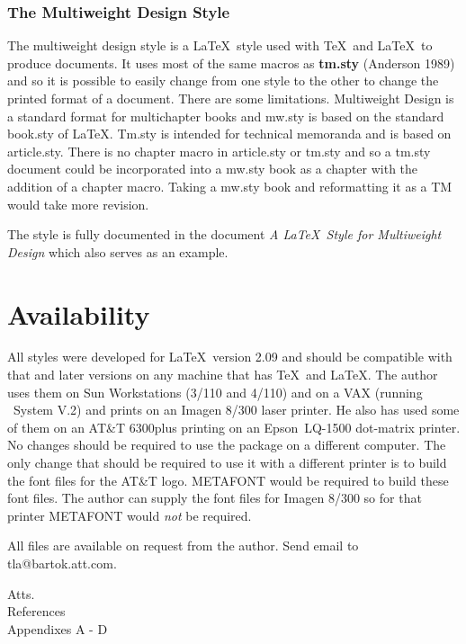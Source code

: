\section{The Multiweight Design Style} The multiweight design style is
a \LaTeX\ style used with \TeX\ and \LaTeX\ to produce documents.  It
uses most of the same macros as {\bf tm.sty} (Anderson 1989) and so it
is possible to easily change from one style to the other to change the
printed format of a document.  There are some limitations.
Multiweight Design is a standard format for multichapter books and
mw.sty is based on the standard book.sty of \LaTeX .  Tm.sty is
intended for technical memoranda and is based on article.sty.  There
is no chapter macro in article.sty or tm.sty and so a tm.sty document
could be incorporated into a mw.sty book as a chapter with the
addition of a chapter macro.  Taking a mw.sty book and reformatting it
as a TM would take more revision.

The style is fully documented in the document {\it A \LaTeX\ Style for
Multiweight Design} which also serves as an example.

\part{Availability}
All styles were developed for \LaTeX\ version 2.09 and should
be compatible with that and later versions on any machine that has
\TeX\ and \LaTeX .  The author uses them on Sun Workstations
(3/110 and 4/110) and
on a VAX (running \UNIX\ System V.2) and prints on an
Imagen 8/300 laser printer.  He also has
used some of them on an AT\&T 6300plus printing on an Epson\tm\
LQ-1500 dot-matrix 
printer.  No changes should be required to use the package on a
different computer.  The only change that should be required to 
use it with a different printer is to build the font files for the
AT\&T logo.  METAFONT would be required to build these font files.  
The author can supply the font files for Imagen 8/300 so for that
printer METAFONT would {\it not} be required. 

All files are available on request from the author.  Send email to
tla@bartok.att.com.
\makesignature

\noindent Atts.\\
References\\
Appendixes A - D

